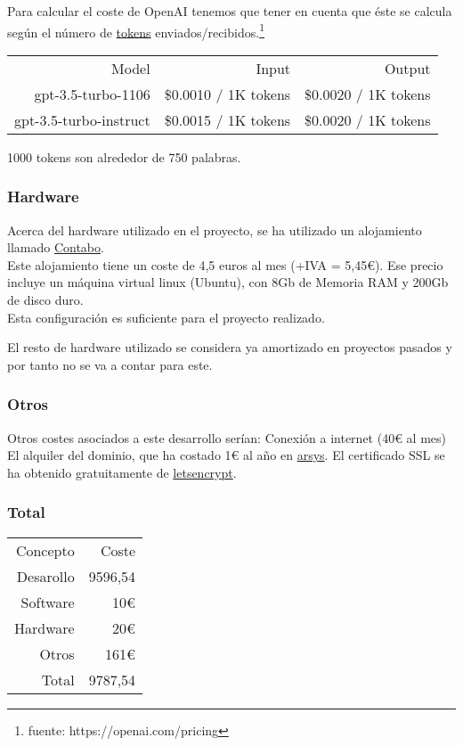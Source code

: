 Para calcular el coste de OpenAI tenemos que tener en cuenta que éste se calcula según el 
número de \href{https://platform.openai.com/tokenizer}{tokens} enviados/recibidos.\footnote{fuente: https://openai.com/pricing}

\begin{tabular}{r r r}
    Model&Input&Output\\
    gpt-3.5-turbo-1106 & \$0.0010 / 1K tokens & \$0.0020 / 1K tokens\\
    gpt-3.5-turbo-instruct & \$0.0015 / 1K tokens & \$0.0020 / 1K tokens\\        
\end{tabular}

1000 tokens son alrededor de 750 palabras.

\subsubsection{Hardware}
Acerca del hardware utilizado en el proyecto, se ha utilizado un alojamiento llamado \href{https://contabo.com/en/}{Contabo}.\\
Este alojamiento tiene un coste de 4,5 euros al mes (+IVA = 5,45€). 
Ese precio incluye un máquina virtual linux (Ubuntu),
con 8Gb de Memoria RAM y 200Gb de disco duro.\\
Esta configuración es suficiente para el proyecto realizado.

El resto de hardware utilizado se considera ya amortizado en proyectos 
pasados y por tanto no se va a contar para este.


\subsubsection{Otros}

Otros costes asociados a este desarrollo serían:
Conexión a internet (40€ al mes)
El alquiler del dominio, que ha costado 1€ al año en \href{https://www.arsys.es/}{arsys}.
El certificado SSL se ha obtenido gratuitamente de \href{https://letsencrypt.org/}{letsencrypt}.

\subsubsection{Total}

\begin{tabular}{r r}
    Concepto & Coste\\
    Desarollo &  9596,54\\
    Software & 10€\\
    Hardware & 20€\\
    Otros & 161€\\
    Total & 9787,54\\

\end{tabular}

